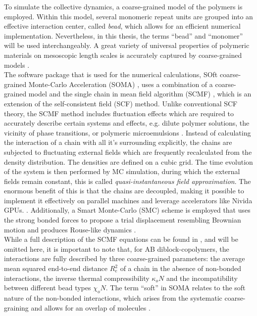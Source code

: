 \documentclass[bachelor,       %
               twoside,        %
               BCOR10mm,       %
                ngerman,english  %
               ]{GAUBM}
\begin{document}
To simulate the collective dynamics, a coarse-grained model of the polymers is employed. Within this model, several monomeric repeat units are grouped into an effective interaction center, called \textit{bead}, which allows for an efficient numerical implementation. Nevertheless, in this thesis, the terms \enquote{bead} and \enquote{monomer} will be used interchangeably. A great variety of universal properties of polymeric materials on mesoscopic length scales is accurately captured by coarse-grained models \cite{Baschnagel03}.\\
The software package that is used for the numerical calculations, SOft coarse-grained Monte-Carlo Acceleration (SOMA) \cite{Schneider_soma}, uses a combination of a coarse-grained model and the single chain in mean field algorithm (SCMF) \cite{Daoulas06}, which is an extension of the self-consistent field (SCF) method. Unlike conventional SCF theory, the SCMF method includes fluctuation effects which are required to accurately describe certain systems and effects, e.g. dilute polymer solutions, the vicinity of phase transitions, or polymeric microemulsions \cite{Bates97, Mueller02, Schmid03}. Instead of calculating the interaction of a chain with all it's surrounding explicitly, the chains are subjected to fluctuating external fields which are frequently recalculated from the density distribution. The densities are defined on a cubic grid. The time evolution of the system is then performed by MC simulation, during which the external fields remain constant, this is called \textit{quasi-instantaneous field approximation}. The enormous benefit of this is that the chains are decoupled, making it possible to implement it effectively on parallel machines and leverage accelerators like Nivida GPUs. \cite{Schneider_soma}. Additionally, a Smart Monte-Carlo (SMC) scheme is employed that uses the strong bonded forces to propose a trial displacement resembling Brownian motion and produces Rouse-like dynamics \cite{Pangali78,Rossky78}.\\
While a full description of the SCMF equations can be found in \cite{Daoulas06}, and will be omitted here, it is important to note that, for AB diblock-copolymers, the interactions are fully described by three coarse-grained parameters: the average mean squared end-to-end distance $R_{e}^2$ of a chain in the absence of non-bonded interactions, the inverse thermal compressibility $\kappa_o N$ and the incompatibility between different bead types $\chi_o N$. The term \enquote{soft} in SOMA relates to the soft nature of the non-bonded interactions, which arises from the systematic coarse-graining and allows for an overlap of molecules \cite{Mueller11soft}.
\end{document}
